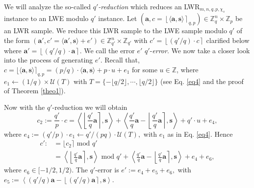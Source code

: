 \documentclass{cta-author}
\begin{document}
We will analyze the so-called \textit{$q'$-reduction} which reduces an LWR$_{m,n,q,p, \chi_s}$ instance to an LWE modulo $q'$ instance. Let
$(\mathbf{a}, c=\left\lfloor \langle \mathbf{a},\mathbf{s} \rangle \right\rceil_{q,p}) \in \mathbb{Z}_q^{n} \times \mathbb{Z}_p$  be an LWR sample. We reduce this LWR sample to the LWE sample modulo $q'$ of the form $(\mathbf{a}',c'=\langle \mathbf{a}',\mathbf{s} \rangle+e') \in \mathbb{Z}_{q'}^{n} \times \mathbb{Z}_{q'}$ with
$
c'=\left \lfloor (q'/q) \cdot c \right \rceil
$ clarified below
where $\mathbf{a}'=\left\lfloor (q'/q)\cdot \mathbf{a} \right\rceil$. We call the error $e'$ $q'$-\textit{error}. We now take a closer look into the process of generating $e'$. Recall that,
$c=\lfloor \langle \mathbf{a}, \mathbf{s} \rangle \rceil_{q,p} =({p}/{q})\cdot \langle \mathbf{a}, \mathbf{s} \rangle+p\cdot u+e_1$
for some $u\in \mathbb{Z}$, where $e_1 \leftarrow (1/q)\times \mathcal{U} \left(T \right )$ with $T=\{-\lfloor q/2 \rfloor,\cdots,\lfloor q/2 \rfloor \}$ (see Eq. \eqref{eq4} and the proof of Theorem \ref{theo1}).


Now with the $q'$-reduction we will obtain
\begin{equation*}
c_2:=\frac{q'}{p}\cdot c=\left \langle \left \lfloor \frac{q'}{q}\mathbf{a} \right \rceil, \mathbf{s} \right\rangle +\left \langle \frac{q'}{q} \mathbf{a}-  \left \lfloor \frac{q'}{q} \mathbf{a}\right \rceil , \mathbf{s} \right\rangle +q'\cdot u+e_4,
\end{equation*}
where $e_4:=(q'/p)\cdot e_1 \leftarrow q'/(pq) \cdot  \mathcal{U}(T),$ with $e_1$ as in Eq. \eqref{eq4}. Hence
\begin{equation*}
\begin{split}
c':&=\lfloor c_2 \rceil \text{ mod }q'\\
&=\left \langle \left \lfloor \frac{q'}{q}\mathbf{a} \right \rceil, \mathbf{s} \right\rangle \text{ mod }q' +\left \langle \frac{q'}{q} \mathbf{a}-  \left \lfloor \frac{q'}{q} \mathbf{a}\right \rceil , \mathbf{s} \right\rangle +e_4+e_6,
\end{split}
\end{equation*}
where $e_6 \in[-{1/2}, {1/2} ).$ The $q'$-error is 
$e':=e_4+e_5+e_6,$
with $e_5:=\left \langle (q'/q) \mathbf{a}-  \left \lfloor (q'/q) \mathbf{a}\right \rceil , \mathbf{s} \right\rangle$. 
\end{document}
